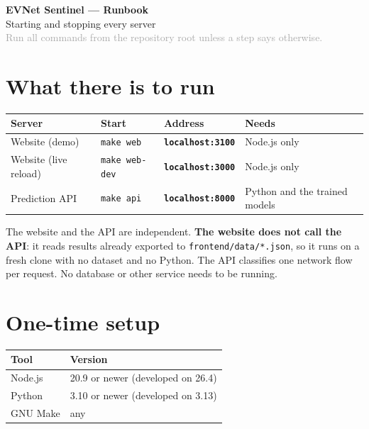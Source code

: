 \documentclass[11pt, a4paper]{article}
\newcommand{\fpath}[1]{\texttt{\small #1}}
\newcommand{\port}[1]{\textbf{\texttt{#1}}}
\begin{document}
\begin{center}
{\LARGE\bfseries\textcolor{primary}{EVNet Sentinel --- Runbook}}\\[0.4em]
{\large Starting and stopping every server}\\[0.3em]
{\small\textcolor{darkgray}{Run all commands from the repository root unless a step says otherwise.}}
\end{center}

\tableofcontents
\bigskip

\section{What there is to run}

\begin{center}
\begin{tabularx}{\textwidth}{lllX}
\toprule
\textbf{Server} & \textbf{Start} & \textbf{Address} & \textbf{Needs} \\
\midrule
Website (demo)         & \texttt{make web}     & \port{localhost:3100} & Node.js only \\
Website (live reload)  & \texttt{make web-dev} & \port{localhost:3000} & Node.js only \\
Prediction API         & \texttt{make api}     & \port{localhost:8000} & Python and the trained models \\
\bottomrule
\end{tabularx}
\end{center}

The website and the API are independent. \textbf{The website does not call the
API}: it reads results already exported to \fpath{frontend/data/*.json}, so it
runs on a fresh clone with no dataset and no Python. The API classifies one
network flow per request. No database or other service needs to be running.

\section{One-time setup}

\begin{center}
\begin{tabular}{ll}
\toprule
\textbf{Tool} & \textbf{Version} \\
\midrule
Node.js   & 20.9 or newer (developed on 26.4) \\
Python    & 3.10 or newer (developed on 3.13) \\
GNU Make  & any \\
\bottomrule
\end{tabular}
\end{center}
\end{document}
